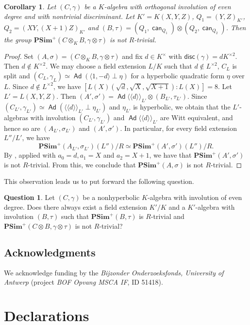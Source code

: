 \documentclass[twoside,11pt]{amsart}
\numberwithin{equation}{section}
\newtheorem{cor}[equation]{Corollary}
\theoremstyle{definition}
\newtheorem{qu}[equation]{Question}
\newcommand{\can}{\operatorname{\mathsf{can}}}
\newcommand{\mg}[1]{{#1}^{\times}}
\newcommand{\sq}[1]{{#1}^{\times 2}}
\newcommand{\s}{\sigma}
\newcommand{\la}{\langle}
\newcommand{\ra}{\rangle}
\newcommand{\lla}{\la\!\la}
\newcommand{\rra}{\ra\!\ra}
\newcommand\Ad{\operatorname{\mathsf{Ad}}}
\newcommand{\disc}{\mathsf{disc}}
\begin{document}
\begin{cor}
Let $(C,\gamma)$ be a $K$-algebra with orthogonal involution of even degree and with nontrivial discriminant.
Let $K'=K(X,Y,Z)$, $Q_1=(Y,Z)_{K'}$, $Q_2=(XY,(X+1)Z)_{K'}$ and $(B,\tau)=(Q_1,\can_{Q_1})\otimes (Q_2,\can_{Q_2})$.
Then the group
$\mathbf{PSim}^+(C\otimes_K B, \gamma\otimes\tau)$ is not $R$-trivial.
\end{cor}
\begin{proof}
Set $(A,\s)=(C\otimes_K B,\gamma\otimes \tau)$ and fix $d\in\mg{K}$ with $\disc(\gamma)=d\sq{K}$.
Then $d\notin\sq{K}$.
We may choose a field extension $L/K$ such that $d\notin\sq{L}$, $C_L$ is split and $(C_L,\gamma_L)\simeq\Ad(\la 1,-d\ra\perp \eta)$ for a hyperbolic quadratic form $\eta$ over $L$.
Since $d\notin\sq{L}$, we have $[L(X)(\sqrt{d},\sqrt{X},\sqrt{X+1}):L(X)]=8$.
Let $L'=L(X,Y,Z)$. Then 
$(A',\s')=\Ad\lla d\rra_{L'}\otimes (B_{L'},\tau_{L'})$.
Since $(C_{L'},\gamma_{L'})\simeq \Ad(\lla d\rra_{L'}\perp \eta_{L'})$ and $\eta_{L'}$ is hyperbolic, we obtain that the $L'$-algebras with involution 
$(C_{L'},\gamma_{L'})$ and $\Ad\lla d\rra_{L'}$ are Witt equivalent, and hence so are 
$(A_{L'},\s_{L'})$ and $(A',\s')$. 
In particular, for every field extension $L''/L'$, we have 
\[\mathbf{PSim}^+(A_{L'},\s_{L'})(L'')/R\simeq \mathbf{PSim}^+(A',\s')(L'')/R.\]
By , applied with $a_0=d,a_1=X$ and $a_2=X+1$, we have that $\mathbf{PSim}^+(A',\s')$ is not $R$-trivial. 
From this, we conclude that $\mathbf{PSim}^+(A,\s)$ is not $R$-trivial.
\end{proof}

This observation leads us to put forward the following question.

\begin{qu}
Let $(C,\gamma)$ be a nonhyperbolic $K$-algebra with involution of even degree.
Does there always exist a field extension $K'/K$ and a $K'$-algebra with involution $(B,\tau)$ such that $\mathbf{PSim}^+(B,\tau)$ is $R$-trivial and $\mathbf{PSim}^+(C\otimes B,\gamma\otimes\tau)$ is not $R$-trivial?
\end{qu}

\subsection*{Acknowledgments}
We acknowledge funding by the \emph{Bijzonder Onderzoeksfonds, University of Antwerp} (project \emph{BOF Opvang MSCA IF}, ID 51418).

\section*{Declarations}
\end{document}
